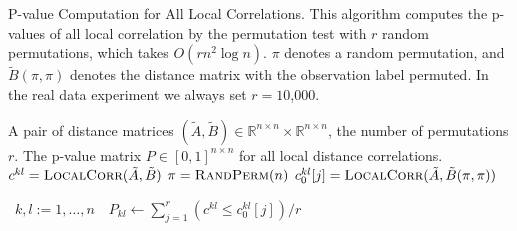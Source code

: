 \documentclass[11pt]{article}
\newcommand{\Real}{\mathbb{R}}
\newcommand{\G}{c}
\newcommand{\Linefor}[2]{%
    \State \algorithmicfor\ {#1}\ \algorithmicdo\ {#2} \algorithmicend\ \algorithmicfor%
}
\newcommand{\rto}{\leftarrow}
\begin{document}
\begin{algorithm}
\caption{P-value Computation for All Local Correlations. This algorithm computes the p-values of all local correlation by the permutation test with $r$ random permutations, which takes $O(rn^2 \log n)$. $\pi$ denotes a random permutation, and $\tilde{B}(\pi,\pi)$ denotes the distance matrix with the observation label permuted. In the real data experiment we always set $r=10$,$000$.}
\label{alg:pval}
\begin{algorithmic}[1]
\Require A pair of distance matrices $(\tilde{A},\tilde{B}) \in \Real^{n \times n} \times \Real^{n \times n}$, the number of permutations $r$.
\Ensure The p-value matrix $P \in [0,1]^{n \times n}$ for all local distance correlations.
\State $\G^{kl}=\textsc{LocalCorr}(\tilde{A},\tilde{B})$ 
\State $\pi=\textsc{RandPerm}(n)$  
\State $\G^{kl}_{0}[j]=\textsc{LocalCorr}(\tilde{A},\tilde{B}(\pi,\pi))$ 
\EndFor

\Linefor{$k,l:=1,\ldots,n$}{$P_{kl} \rto \sum_{j=1}^{r}(\G^{kl} \leq \G^{kl}_{0}[j])/r$}
\EndFunction
\end{algorithmic}
\end{algorithm}
\end{document}
